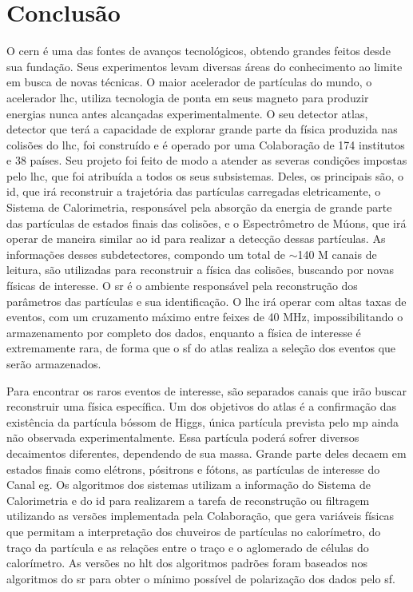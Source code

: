 \chapter{Conclusão}

O \gls{cern} é uma das fontes de avanços tecnológicos, obtendo grandes feitos
desde sua fundação. Seus experimentos
levam diversas áreas do conhecimento ao limite em busca de novas técnicas. 
O maior acelerador de partículas do mundo, o acelerador \gls{lhc}, utiliza
tecnologia de ponta em seus magneto para produzir energias nunca antes
alcançadas experimentalmente. O seu detector \gls{atlas}, detector que terá a
capacidade de explorar grande parte da física produzida nas colisões do
\gls{lhc}, foi construído e é operado por uma Colaboração de 174 institutos e 38 
países. Seu projeto foi feito de modo a atender as severas condições impostas
pelo \gls{lhc}, que foi atribuída a todos os seus subsistemas. Deles, os principais são, 
o \gls{id}, que irá reconstruir a trajetória das partículas carregadas 
eletricamente, o Sistema de Calorimetria, responsável pela absorção da energia 
de grande parte das partículas de estados finais das colisões, e o Espectrômetro de 
Múons, que irá operar de maneira similar ao \gls{id} para realizar a detecção 
dessas partículas. As informações desses subdetectores, compondo um total de
$\sim$140 M canais de leitura, são utilizadas para reconstruir a física das colisões, 
buscando por novas físicas de interesse. O
\glsdesc{sr} é o ambiente responsável pela reconstrução dos parâmetros das
partículas e sua identificação. O \gls{lhc} irá operar com altas
taxas de eventos, com um cruzamento máximo entre feixes de 40 MHz,
impossibilitando o armazenamento por completo dos dados, enquanto
a física de interesse é extremamente rara, de forma que o \glsdesc{sf} do
\gls{atlas} realiza a seleção dos eventos que serão armazenados.

Para encontrar os raros eventos de interesse, são separados canais que irão
buscar reconstruir uma física específica. Um dos objetivos do \gls{atlas} é a
confirmação das existência da partícula bóssom de Higgs, única partícula
prevista pelo \gls{mp} ainda não observada experimentalmente. Essa partícula
poderá sofrer diversos decaimentos diferentes, dependendo de sua massa. Grande
parte deles decaem em estados finais como elétrons, pósitrons e fótons, as
partículas de interesse do Canal \gls{eg}. Os algoritmos dos sistemas
utilizam a informação do Sistema de Calorimetria e do \gls{id} para realizarem a
tarefa de reconstrução ou filtragem utilizando as versões implementada pela
Colaboração, que gera variáveis físicas que permitam a interpretação dos
chuveiros de partículas no calorímetro, do traço da partícula e as relações
entre o traço e o aglomerado de células do calorímetro. As versões no \gls{hlt}
dos algoritmos padrões foram baseados nos algoritmos do \gls{sr} para obter o
mínimo possível de polarização dos dados pelo \gls{sf}.

